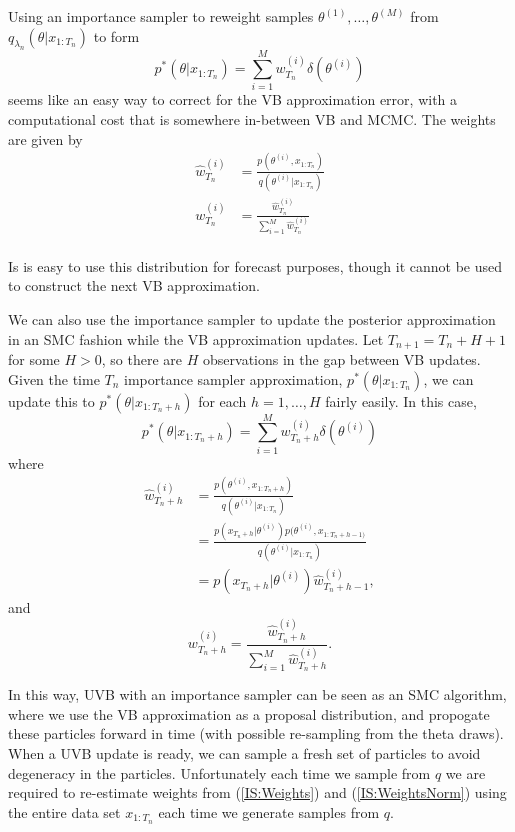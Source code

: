 \documentclass[12pt,a4paper]{article}\usepackage[]{graphicx}\usepackage[]{color}
\begin{document}
Using an importance sampler to reweight samples $\theta^{(1)}, \dots, \theta^{(M)}$ from $q_{\lambda_n}(\theta | x_{1:T_n})$ to form 
\begin{equation}
\label{IS:Approx}
p^*(\theta | x_{1:T_n}) = \sum_{i=1}^M w^{(i)}_{T_n} \delta(\theta^{(i)})
\end{equation}
seems like an easy way to correct for the VB approximation error, with a computational cost that is somewhere in-between VB and MCMC. The weights are given by
\begin{align}
\hat{w}^{(i)}_{T_n} &= \frac{p(\theta^{(i)}, x_{1:T_n})}{q(\theta^{(i)} | x_{1:T_n})} \label{IS:Weights} \\
w^{(i)}_{T_n} &= \frac{\hat{w}^{(i)}_{T_n}}{\sum_{i=1}^M \hat{w}^{(i)}_{T_n}} \label{IS:WeightsNorm}
\end{align}
\\

Is is easy to use this distribution for forecast purposes, though it cannot be used to construct the next VB approximation.

We can also use the importance sampler to update the posterior approximation in an SMC fashion while the VB approximation updates. Let $T_{n+1} = T_{n} + H + 1$ for some $H > 0$, so there are $H$ observations in the gap between VB updates.
\\

Given the time $T_n$ importance sampler approximation, $p^*(\theta | x_{1:T_n})$, we can update this to $p^*(\theta | x_{1:T_n+h})$ for each $h = 1, \dots, H$ fairly easily. In this case,
\begin{equation}
\label{IS:ApproxUpdate}
p^*(\theta | x_{1:T_n+h}) = \sum_{i=1}^M w^{(i)}_{T_n+h} \delta(\theta^{(i)})
\end{equation}
where
\begin{align}
\hat{w}^{(i)}_{T_n+h} &= \frac{p(\theta^{(i)}, x_{1:T_n+h})}{q(\theta^{(i)} | x_{1:T_n})} \nonumber \\
&= \frac{p(x_{T_n+h} | \theta^{(i)})p(\theta^{(i)}, x_{1:T_n+h-1)}}{q(\theta^{(i)} | x_{1:T_n})} \nonumber \\
&= p(x_{T_n+h} | \theta^{(i)}) \hat{w}^{(i)}_{T_n+h-1}, \label{IS:UpdateWeights}
\end{align}
and
\begin{equation}
\label{IS:UpdateWeightsNorma}
w^{(i)}_{T_n+h} = \frac{\hat{w}^{(i)}_{T_n+h}}{\sum_{i=1}^M \hat{w}^{(i)}_{T_n+h}}.
\end{equation}

In this way, UVB with an importance sampler can be seen as an SMC algorithm, where we use the VB approximation as a proposal distribution, and propogate these particles forward in time (with possible re-sampling from the theta draws). When a UVB update is ready, we can sample a fresh set of particles to avoid degeneracy in the particles. Unfortunately each time we sample from $q$ we are required to re-estimate weights from (\ref{IS:Weights}) and (\ref{IS:WeightsNorm}) using the entire data set $x_{1:T_n}$ each time we generate samples from $q$. 
\\
\end{document}
